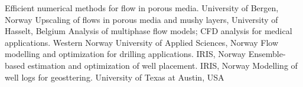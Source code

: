 {Efficient numerical methods for flow in porous media. University of Bergen, Norway}
{Upscaling of flows in porous media and mushy layers, University of Hasselt, Belgium}
{Analysis of multiphase flow models; CFD analysis for medical applications. Western Norway University of Applied Sciences, Norway}
{Flow modelling and optimization for drilling applications. IRIS, Norway}
{Ensemble-based estimation and optimization of well placement. IRIS, Norway}
{Modelling of well logs for geosttering. University of Texas at Austin, USA}